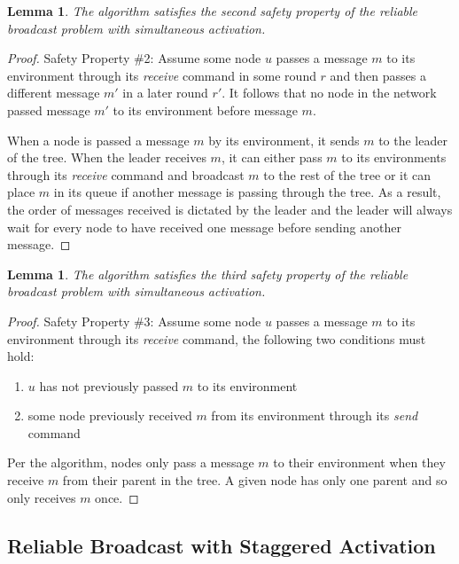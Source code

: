 \documentclass[english]{article}
\newtheorem{lemma}[theorem]{Lemma}
\begin{document}
\begin{lemma}
\label{StaticRBSafety2}
The algorithm satisfies the second safety property of the reliable broadcast problem with simultaneous activation.
\end{lemma}
\begin{proof}
Safety Property \#2: Assume some node $u$ passes a message $m$ to its environment through its \textit{receive} command in some round $r$ and then passes a different message $m'$ in a later round $r'$. It follows that no node in the network passed message $m'$ to its environment before message $m$. 

When a node is passed a message $m$ by its environment, it sends $m$ to the leader of the tree. When the leader receives $m$, it can either pass $m$ to its environments through its \textit{receive} command and broadcast $m$ to the rest of the tree or it can place $m$ in its queue if another message is passing through the tree. As a result, the order of messages received is dictated by the leader and the leader will always wait for every node to have received one message before sending another message. 
\end{proof}

\begin{lemma}
\label{StaticRBSafety3}
The algorithm satisfies the third safety property of the reliable broadcast problem with simultaneous activation.
\end{lemma}
\begin{proof}
Safety Property \#3: Assume some node $u$ passes a message $m$ to its environment through its \textit{receive} command, the following two conditions must hold:
  \begin {enumerate}
    \item $u$ has not previously passed $m$ to its environment
    \item some node previously received $m$ from its environment through its \textit{send} command
  \end{enumerate}

Per the algorithm, nodes only pass a message $m$ to their environment when they receive $m$ from their parent in the tree. A given node has only one parent and so only receives $m$ once.
\end{proof}

\subsection {Reliable Broadcast with Staggered Activation}
\end{document}
